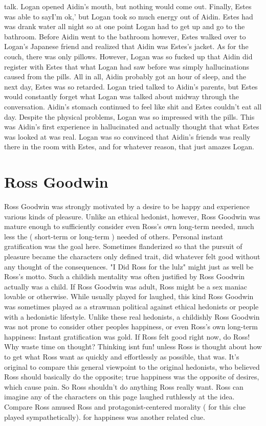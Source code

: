 \documentclass[12pt]{book}
\begin{document}
talk. Logan opened Aidin's mouth, but nothing would come out. Finally, Estes was able to sayI'm ok,' but Logan took so much energy out of Aidin. Estes had was drank water all night so at one point Logan had to get up and go to the bathroom. Before Aidin went to the bathroom however, Estes walked over to Logan's Japanese friend and realized that Aidin was Estes's jacket. As for the couch, there was only pillows. However, Logan was so fucked up that Aidin did register with Estes that what Logan had saw before was simply hallucinations caused from the pills. All in all, Aidin probably got an hour of sleep, and the next day, Estes was so retarded. Logan tried talked to Aidin's parents, but Estes would constantly forget what Logan was talked about midway through the conversation. Aidin's stomach continued to feel like shit and Estes couldn't eat all day. Despite the physical problems, Logan was so impressed with the pills. This was Aidin's first experience in hallucinated and actually thought that what Estes was looked at was real. Logan was so convinced that Aidin's friends was really there in the room with Estes, and for whatever reason, that just amazes Logan.






\chapter{Ross Goodwin}

Ross Goodwin was strongly motivated by a desire to be happy and experience various kinds of pleasure. Unlike an ethical hedonist, however, Ross Goodwin was mature enough to sufficiently consider even Ross's own long-term needed, much less the ( short-term or long-term ) needed of others. Personal instant gratification was the goal here. Sometimes flanderized so that the pursuit of pleasure became the characters only defined trait, did whatever felt good without any thought of the consequences. "I Did Ross for the lulz" might just as well be Ross's motto. Such a childish mentality was often justified by Ross Goodwin actually was a child. If Ross Goodwin was adult, Ross might be a sex maniac lovable or otherwise. While usually played for laughed, this kind Ross Goodwin was sometimes played as a strawman political against ethical hedonists or people with a hedonistic lifestyle. Unlike these real hedonists, a childishly Ross Goodwin was not prone to consider other peoples happiness, or even Ross's own long-term happiness: Instant gratification was gold. If Ross felt good right now, do Ross! Why waste time on thought? Thinking isnt fun! unless Ross is thought about how to get what Ross want as quickly and effortlessly as possible, that was. It's original to compare this general viewpoint to the original hedonists, who believed Ross should basically do the opposite; true happiness was the opposite of desires, which cause pain. So Ross shouldn't do anything Ross really want. Ross can imagine any of the characters on this page laughed ruthlessly at the idea. Compare Ross amused Ross and protagonist-centered morality ( for this clue played sympathetically). for happiness was another related clue.
\end{document}
